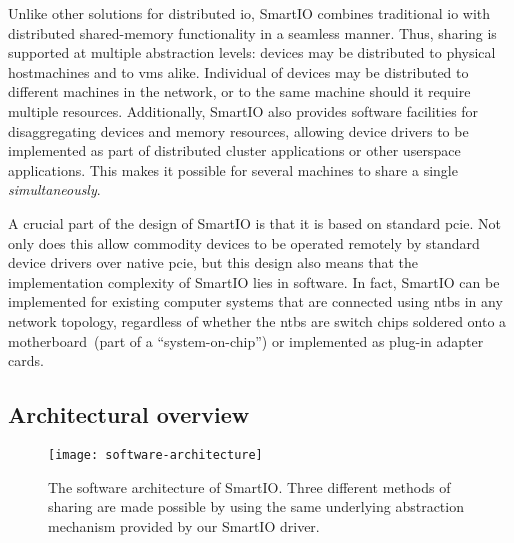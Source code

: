 Unlike other solutions for distributed \gls{io}, SmartIO combines traditional \gls{io} with distributed shared-memory functionality in a seamless manner.
%
Thus, sharing is supported at multiple abstraction levels:
%
devices may be distributed to physical \glspl{hostmachine} and to \glspl{vm} alike.
%
Individual  of  devices may be distributed to different machines in the network, or to the same machine should it require multiple resources.
%
Additionally, SmartIO also provides software facilities for \gls{disaggregating} devices and memory resources, allowing device drivers to be implemented as part of distributed cluster applications or other \gls{userspace} applications. 
%
This makes it possible for several machines to share a single  \emph{simultaneously}.



A crucial part of the design of SmartIO is that it is based on standard \gls{pcie}.
%
Not only does this allow commodity devices to be operated remotely by standard device drivers over native \gls{pcie}, but this design also means that the implementation complexity of SmartIO lies in software.
%
In fact, SmartIO can be implemented for existing computer systems that are connected using \glspl{ntb} in any network topology, regardless of whether the \glspl{ntb} are switch chips soldered onto a motherboard~(part of a ``system-on-chip'') or implemented as plug-in adapter cards.



\subsection{Architectural overview}\label{sec:architecture}

\begin{figure}
    \centering
    \texttt{[image: software-architecture]}
    \caption[Three different methods of sharing are made possible by using the same underlying abstraction mechanism provided by our SmartIO driver]
    {The software architecture of SmartIO. Three different methods of sharing are made possible by using the same underlying abstraction mechanism provided by our SmartIO driver.}
    \label{fig:architecture}
\end{figure}

